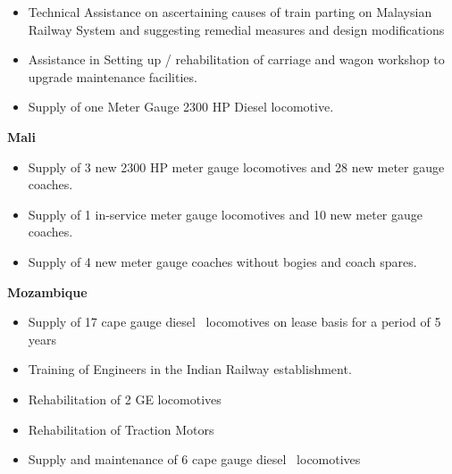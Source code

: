 \bigskip

\begin{itemize}
\item {\color[rgb]{0.0,0.0,0.039215688}
Technical Assistance on ascertaining causes of train parting on Malaysian Railway System and suggesting remedial
measures and design modifications \ }
\item {\color[rgb]{0.0,0.0,0.039215688}
Assistance in Setting up / rehabilitation of carriage and wagon workshop to upgrade maintenance facilities. }
\item {\color[rgb]{0.0,0.0,0.039215688}
Supply of one Meter Gauge 2300 HP Diesel locomotive.}
\end{itemize}

\bigskip

{\color[rgb]{0.0,0.0,0.039215688}
\textbf{Mali}}


\bigskip

\begin{itemize}
\item {\color[rgb]{0.0,0.0,0.039215688}
Supply of 3 new 2300 HP meter gauge locomotives and 28 new meter gauge coaches.}
\item {\color[rgb]{0.0,0.0,0.039215688}
Supply of 1 in-service meter gauge locomotives and 10 new meter gauge coaches.}
\item {\color[rgb]{0.0,0.0,0.039215688}
Supply of 4 new meter gauge coaches without bogies and coach spares.}
\end{itemize}

\bigskip

{\color[rgb]{0.0,0.0,0.039215688}
\textbf{Mozambique}}


\bigskip

\begin{itemize}
\item {\color[rgb]{0.0,0.0,0.039215688}
Supply of 17 cape gauge diesel \ locomotives on lease basis for a period of 5 years }
\item {\color[rgb]{0.0,0.0,0.039215688}
Training of Engineers in the Indian Railway establishment.}
\item {\color[rgb]{0.0,0.0,0.039215688}
Rehabilitation of 2 GE locomotives }
\item {\color[rgb]{0.0,0.0,0.039215688}
Rehabilitation of Traction Motors }
\item {\color[rgb]{0.0,0.0,0.039215688}
Supply and maintenance of 6 cape gauge diesel \ locomotives }
\end{itemize}

\bigskip

